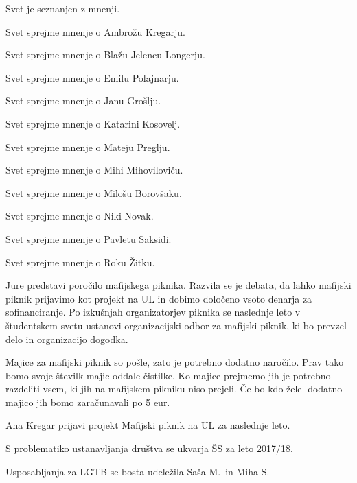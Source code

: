 \documentclass{seja}
\begin{document}
\begin{ad}
\item
Svet je seznanjen z mnenji.

\begin{sklep*}
Svet sprejme mnenje o Ambrožu Kregarju.
\end{sklep*}
\begin{sklep*}
Svet sprejme mnenje o Blažu Jelencu Longerju.
\end{sklep*}
\begin{sklep*}
Svet sprejme mnenje o Emilu Polajnarju.
\end{sklep*}
\begin{sklep*}
Svet sprejme mnenje o Janu Grošlju.
\end{sklep*}
\begin{sklep*}
Svet sprejme mnenje o Katarini Kosovelj.
\end{sklep*}
\begin{sklep*}
Svet sprejme mnenje o Mateju Preglju.
\end{sklep*}
\begin{sklep*}
Svet sprejme mnenje o Mihi Mihoviloviču.
\end{sklep*}
\begin{sklep*}
Svet sprejme mnenje o Milošu Borovšaku.
\end{sklep*}
\begin{sklep*}
Svet sprejme mnenje o Niki Novak.
\end{sklep*}
\begin{sklep*}
Svet sprejme mnenje o Pavletu Saksidi.
\end{sklep*}
\begin{sklep*}
Svet sprejme mnenje o Roku Žitku.
\end{sklep*}

\item
Jure predstavi poročilo mafijskega piknika. Razvila se je debata, da lahko mafijski piknik
prijavimo kot projekt na UL in dobimo določeno vsoto denarja za sofinanciranje.
Po izkušnjah organizatorjev piknika se naslednje leto v študentskem svetu ustanovi
organizacijski odbor za mafijski piknik, ki bo prevzel delo in organizacijo dogodka.

Majice za mafijski piknik so pošle, zato je potrebno dodatno naročilo.
Prav tako bomo svoje številk majic oddale čistilke. Ko majice prejmemo
jih je potrebno razdeliti vsem, ki jih na mafijskem pikniku niso prejeli.
Če bo kdo želel dodatno majico jih bomo zaračunavali po 5 eur.

\begin{sklep*}
Ana Kregar prijavi projekt Mafijski piknik na UL za naslednje leto.
\end{sklep*}

\item
S problematiko ustanavljanja društva se ukvarja ŠS za leto 2017/18.

Usposabljanja za LGTB se bosta udeležila Saša M.\ in Miha S.

\end{ad}
\end{document}
